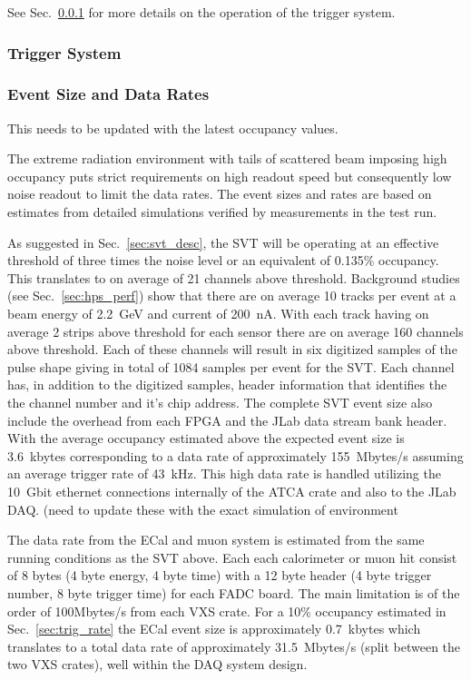 See Sec.~\ref{sec:triggerdaq} for more details on the operation of the trigger system.


\subsubsection{Trigger System}
\label{sec:triggerdaq}


\subsubsection{Event Size and Data Rates}

{\color{red}This needs to be updated with the latest occupancy values.}

The extreme radiation environment with tails of scattered beam imposing high occupancy
 puts strict requirements on high readout speed but consequently low noise readout to limit 
 the data rates. The event sizes and rates are based on estimates from detailed simulations 
 verified by measurements in the test run. 
  
As suggested in Sec.~\ref{sec:svt_desc}, the SVT will be operating at an effective threshold of three
times the noise level or an equivalent of 0.135\% occupancy. This translates to on average of 21 channels above threshold. Background studies (see Sec.~\ref{sec:hps_perf}) show that 
there are on average 10 tracks per event at a beam energy of 2.2~GeV and current of 
200~nA. With each track 
having on average 2 strips above threshold for each sensor there are on average 160 channels above threshold. Each of these channels will result in six digitized samples of the 
pulse shape giving in total of 1084 samples per event for the SVT.
Each channel has, in addition to the digitized samples,  header information that identifies the 
the channel number and it's chip address. The complete SVT event size also 
include the overhead from each FPGA and the JLab data stream bank header.  
With the average occupancy 
estimated above the expected event size is 3.6~kbytes corresponding to a data rate of 
approximately 155~Mbytes/s assuming an average trigger rate of 43~kHz.  
This high data rate is handled utilizing 
the 10~Gbit ethernet connections internally of the ATCA crate and also to the JLab DAQ.
{\color{red} (need to update these with the exact simulation of environment}


The data rate from the ECal and muon system is estimated from the same running 
conditions as the SVT above. 
Each each calorimeter or muon hit consist of 8 bytes (4 byte energy, 4 byte time)
 with a 12 byte header (4 byte trigger number, 8 byte trigger time) for each FADC board. 
 The main limitation is of the order of 100Mbytes/s from each VXS crate. For a 
 10\% occupancy estimated in Sec.~\ref{sec:trig_rate} the ECal event size is approximately 0.7~kbytes which translates to a total data rate of approximately 31.5~Mbytes/s 
(split between the two VXS crates), well within the DAQ system design. 

